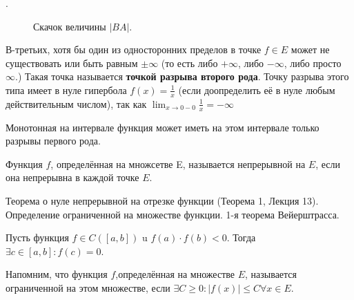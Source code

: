 . \begin{figure}[h!]
    \caption{Скачок величины $|BA|$.}
    \label{fig:image}
\end{figure}

В-третьих, хотя бы один из односторонних пределов в точке $f \in E$ может не существовать или быть равным $\pm \infty$ (то есть либо $+\infty$, либо $-\infty$, либо просто $\infty$.) Такая точка называется \textbf{точкой разрыва второго рода}. Точку разрыва этого типа имеет в нуле гипербола $f(x)=\frac{1}{x}$ (если доопределить её в нуле любым действительным числом), так как $\lim _{x \rightarrow 0-0} \frac{1}{x}=-\infty$
\begin{proposition}
    Монотонная на интервале функция может иметь на этом интервале только разрывы первого рода.
\end{proposition}

\begin{definition}
    Функция $f$, определённая на множсетве E, называется непрерывной на $E$, если она непрерывна в каждой точке $E$.
\end{definition}

\newpage
\begin{problem}
Теорема о нуле непрерывной на отрезке функции (Теорема 1, Лекция 13). Определение
ограниченной на множестве функции. 1-я теорема Вейерштрасса.
\end{problem}
\begin{theorem}
    Пусть функция $f \in C([a, b])$ u $f(a) \cdot f(b)<0$. Тогда $\exists c \in[a, b]: f(c)=0$.

    Напомним, что функция $f$,определённая на множестве $E$, называется ограниченной на этом множестве, если $\exists C \geq 0:|f(x)| \leq C \forall x \in E$.
\end{theorem}

